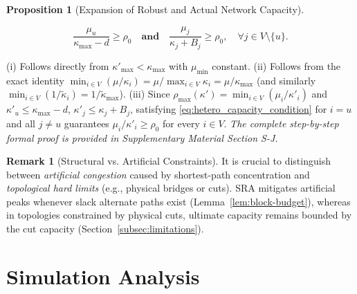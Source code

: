 \documentclass[journal]{IEEEtran}
\theoremstyle{plain}
\newtheorem{proposition}{Proposition}
\theoremstyle{definition}
\newtheorem{remark}{Remark}
\newcommand{\rev}[1]{{\color{blue}#1}}
\begin{document}
\begin{proposition}[\rev{Expansion of Robust and Actual Network Capacity}]
{\begin{enumerate}[label=(\roman*)]
\begin{equation}\label{eq:hetero_capacity_condition}
\frac{\mu_u}{\kappa_{\max} - d} \ge \rho_0 \quad \textbf{and} \quad \frac{\mu_j}{\kappa_j + B_j} \ge \rho_0,\quad \forall j \in V \setminus \{u\}.
\end{equation}
\end{enumerate}}
\end{proposition}
\begin{IEEEproof}
(i) Follows directly from $\kappa'_{\max} < \kappa_{\max}$ with $\mu_{\min}$ constant. (ii) Follows from the exact identity $\min_{i \in V}(\mu/\kappa_i) = \mu / \max_{i \in V}\kappa_i = \mu/\kappa_{\max}$ (and similarly $\min_{i \in V}(1/\widetilde{\kappa}_i) = 1/\widetilde{\kappa}_{\max}$). (iii) Since $\rho_{\max}(\kappa') = \min_{i \in V}(\mu_i/\kappa'_i)$ and $\kappa'_u \le \kappa_{\max}-d$, $\kappa'_j \le \kappa_j+B_j$, satisfying \eqref{eq:hetero_capacity_condition} for $i=u$ and all $j \neq u$ guarantees $\mu_i/\kappa'_i \ge \rho_0$ for every $i \in V$. \textit{The complete step-by-step formal proof is provided in Supplementary Material Section S-J.}
\end{IEEEproof}

\begin{remark}[Structural vs. Artificial Constraints]
It is crucial to distinguish between \textit{artificial congestion} caused by shortest-path concentration and \textit{topological hard limits} (e.g., physical bridges or cuts). 
SRA mitigates artificial peaks whenever slack alternate paths exist (Lemma~\ref{lem:block-budget}), whereas in topologies constrained by physical cuts, ultimate capacity remains bounded by the cut capacity (Section~\ref{subsec:limitations}).
\end{remark}

\section{Simulation Analysis}
\label{sec:simulation}
\end{document}
